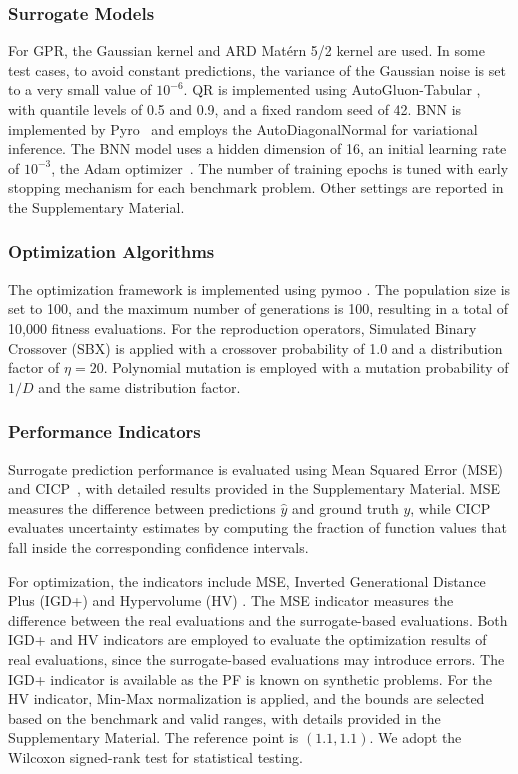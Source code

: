 \documentclass{article}
\begin{document}
\subsubsection{Surrogate Models}
For GPR, the Gaussian kernel \cite{gaussian_kernel} and ARD Mat\'ern 5/2 kernel \cite{kernel_Matern_52} are used. In some test cases, to avoid constant predictions, the variance of the Gaussian noise is set to a very small value of $10^{-6}$. QR is implemented using AutoGluon-Tabular \cite{ml_autogluon}, with quantile levels of 0.5 and 0.9, and a fixed random seed of 42. BNN is implemented by Pyro~\cite{pyro} and employs the AutoDiagonalNormal for variational inference. The BNN model uses a hidden dimension of 16, an initial learning rate of $10^{-3}$, the Adam optimizer~\cite{adam}. The number of training epochs is tuned with early stopping mechanism for each benchmark problem. Other settings are reported in the Supplementary Material.

\subsubsection{Optimization Algorithms}
The optimization framework is implemented using pymoo \cite{pymoo}. The population size is set to 100, and the maximum number of generations is 100, resulting in a total of 10,000 fitness evaluations. For the reproduction operators, Simulated Binary Crossover (SBX) \cite{opt-sbx} is applied with a crossover probability of 1.0 and a distribution factor of $\eta = 20$. Polynomial mutation \cite{nsga_ii} is employed with a mutation probability of $1/D$ and the same distribution factor. 

\subsubsection{Performance Indicators}
Surrogate prediction performance is evaluated using Mean Squared Error (MSE) and CICP~\cite{cicp}, with detailed results provided in the Supplementary Material. MSE measures the difference between predictions $\hat{y}$ and ground truth $y$, while CICP evaluates uncertainty estimates by computing the fraction of function values that fall inside the corresponding confidence intervals. 

For optimization, the indicators include MSE, Inverted Generational Distance Plus (IGD+) \cite{igd_plus} and Hypervolume (HV) \cite{hypervolume}. The MSE indicator measures the difference between the real evaluations and the surrogate-based evaluations. Both IGD+ and HV indicators are employed to evaluate the optimization results of real evaluations, since the surrogate-based evaluations may introduce errors. The IGD+ indicator is available as the PF is known on synthetic problems. For the HV indicator, Min-Max normalization \cite{indicator} is applied, and the bounds are selected based on the benchmark \cite{benchmark} and valid ranges, with details provided in the Supplementary Material. The reference point is $(1.1, 1.1)$. We adopt the Wilcoxon signed-rank test \cite{wilcoxon} for statistical testing.
\end{document}
